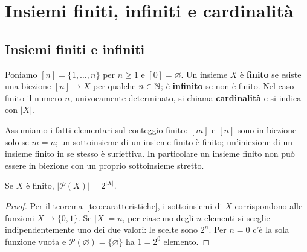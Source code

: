 \chapter{Insiemi finiti, infiniti e cardinalità}

\section{Insiemi finiti e infiniti}
\begin{definizione}
Poniamo $[n]=\{1,\ldots,n\}$ per $n\ge1$ e $[0]=\varnothing$. Un insieme $X$ è \textbf{finito} se esiste una biezione $[n]\to X$ per qualche $n\in\mathbb{N}$; è \textbf{infinito} se non è finito. Nel caso finito il numero $n$, univocamente determinato, si chiama \textbf{cardinalità} e si indica con $|X|$.
\end{definizione}

Assumiamo i fatti elementari sul conteggio finito: $[m]$ e $[n]$ sono in biezione solo se $m=n$; un sottoinsieme di un insieme finito è finito; un'iniezione di un insieme finito in se stesso è suriettiva. In particolare un insieme finito non può essere in biezione con un proprio sottoinsieme stretto.

\begin{corollario}
Se $X$ è finito, $|\mathcal P(X)|=2^{|X|}$.
\end{corollario}
\begin{proof}
Per il teorema~\ref{teo:caratteristiche}, i sottoinsiemi di $X$ corrispondono alle funzioni $X\to\{0,1\}$. Se $|X|=n$, per ciascuno degli $n$ elementi si sceglie indipendentemente uno dei due valori: le scelte sono $2^n$. Per $n=0$ c'è la sola funzione vuota e $\mathcal P(\varnothing)=\{\varnothing\}$ ha $1=2^0$ elemento.
\end{proof}

